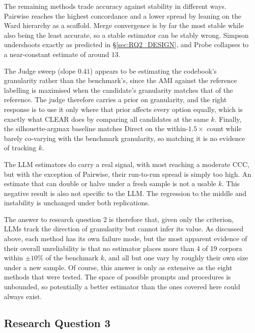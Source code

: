 \documentclass[11pt,a4paper,oneside]{report}
\begin{document}
The remaining methods trade accuracy against stability in different ways. Pairwise reaches the highest concordance and a lower spread by leaning on the Ward hierarchy as a scaffold. Merge convergence is by far the most stable while also being the least accurate, so a stable estimator can be stably wrong.
Simpson undershoots exactly as predicted in \S\ref{sec:RQ2_DESIGN}, and
Probe collapses to a near-constant estimate of around $13$. 

The Judge sweep (slope $0.41$) appears to be estimating the codebook's
granularity rather than the benchmark's, since the AMI against the
reference labelling is maximised when the candidate's granularity matches
that of the reference. The judge therefore carries a prior on granularity, and the right
response is to use it only where that prior affects every option equally,
which is exactly what CLEAR does by comparing all candidates at the
same $k$. Finally, the silhouette-argmax baseline matches Direct on the within-$1.5\times$ count while barely co-varying with the benchmark granularity, so matching it is no evidence of tracking $k$.

The LLM estimators do carry a real signal, with most reaching a moderate CCC, but with the exception of Pairwise, their run-to-run spread is simply too high. An estimate that can double or halve
under a fresh sample is not a usable $k$. This negative result is also
not specific to the LLM. The regression to the middle and instability
is unchanged under both replications.

The answer to research question 2 is therefore that, given only the
criterion, LLMs track the direction of granularity but cannot infer its
value. As discussed above, each method has its own failure mode, but the most apparent evidence of their overall unreliability is that no estimator places more than 4 of 19 corpora within $\pm 10\%$ of the benchmark $k$, and all but one vary by roughly their own size under a new sample. Of course, this answer is only as extensive as the eight methods that were tested. The space of possible prompts and procedures is unbounded, so potentially a better estimator than the ones covered here could always exist.


\subsection{Research Question 3}
\end{document}
